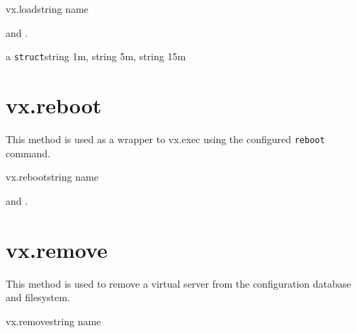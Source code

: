\begin{rpcsynopsis}{vx.load}{string name}
\end{rpcsynopsis}

\begin{rpcaccess}
 and \rpcownerchecks.
\end{rpcaccess}

\begin{rpcreturncomplex}{a \texttt{struct}}{string 1m, string 5m, string 15m}
\end{rpcreturncomplex}

\rpcnoerrors


\section{vx.reboot}

This method is used as a wrapper to vx.exec using the configured
\texttt{reboot} command.

\begin{rpcsynopsis}{vx.reboot}{string name}
\end{rpcsynopsis}

\begin{rpcaccess}
 and \rpcownerchecks.
\end{rpcaccess}


\begin{rpcerrors}
\end{rpcerrors}


\section{vx.remove}

This method is used to remove a virtual server from the configuration database
and filesystem.

\begin{rpcsynopsis}{vx.remove}{string name}
\end{rpcsynopsis}

